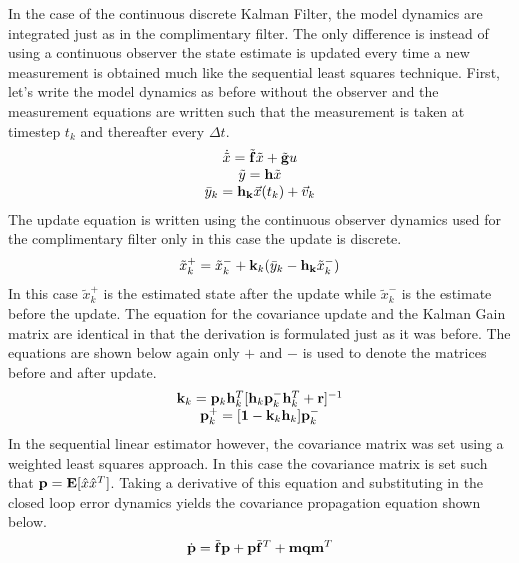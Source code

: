 \documentclass{article}
\begin{document}
In the case of the continuous discrete Kalman Filter, the model
dynamics are integrated just as in the complimentary filter. The only
difference is instead of using a continuous observer the state
estimate is updated every time a new measurement is obtained much like
the sequential least squares technique. First, let's write the model
dynamics as before without the observer and the measurement equations
are written such that the measurement is taken at timestep $t_k$ and
thereafter every $\Delta t$. 
\begin{equation}\label{e:model_dynamics}
  \begin{matrix}
    \dot{\tilde{x}} = \tilde{{\bf f}}\tilde{x} + \tilde{{\bf g}}u \\
    \tilde{y} = {\bf h}\tilde{x} \\
    \bar{y}_k = {\bf h_k}\vec{x}(t_k) + \vec{v}_k
  \end{matrix}
\end{equation}
The update equation is written using the continuous observer dynamics
used for the complimentary filter only in this case the update is
discrete.
\begin{equation}\label{e:state_update}
  \tilde{x}_k^+ = \tilde{x}_k^- + {\bf k}_k(\bar{y}_k-{\bf
    h_k}\tilde{x}_k^-)
\end{equation}
In this case $\tilde{x}_k^+$ is the estimated state after the update
while $\tilde{x}_k^-$ is the estimate before the update. The equation
for the covariance update and the Kalman Gain matrix are identical in
that the derivation is formulated just as it was before. The equations
are shown below again only $+$ and $-$ is used to denote the matrices
before and after update.
\begin{equation}\label{e:kalman_gain}
  \begin{matrix}
  {\bf k}_{k} = {\bf p}_{k}{\bf h}_{k}^T[{\bf h}_{k}{\bf p}_k^-{\bf h}_{k}^T+{\bf r}]^{-1}\\
  {\bf p}_{k}^+ = [{\bf 1} - {\bf k}_{k}{\bf h}_{k}]{\bf p}_k^-
  \end{matrix}
\end{equation}
In the sequential linear estimator however, the covariance matrix was
set using a weighted least squares approach. In this case the
covariance matrix is set such that ${\bf p} = {\bf
  E}[\hat{x}\hat{x}^T]$. Taking a derivative of this equation and
substituting in the closed loop error dynamics yields the covariance
propagation equation shown below.
\begin{equation}\label{e:covariance_dynamics}
  \dot{{\bf p}} = \tilde{{\bf f}}{\bf p} + {\bf p}\tilde{{\bf f}}^T +
      {\bf m}{\bf q}{\bf m}^T
\end{equation}
\end{document}
